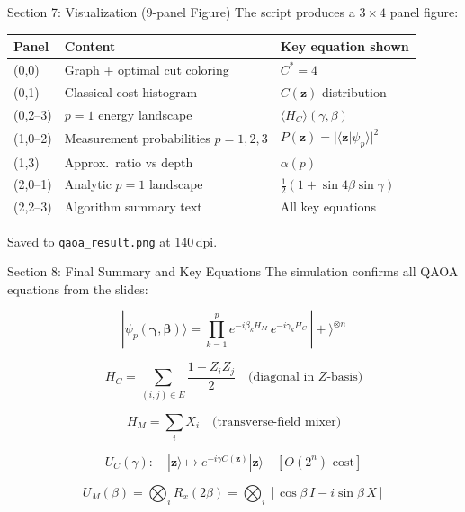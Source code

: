 \documentclass{beamer}
\begin{document}
\begin{frame}
\begin{frame}{Section 7: Visualization (9-panel Figure)}
The script produces a $3\times 4$ panel figure:

\medskip

\begin{center}
\small
\begin{tabular}{lll}
\hline
\textbf{Panel} & \textbf{Content} & \textbf{Key equation shown} \\
\hline
(0,0) & Graph + optimal cut coloring & $C^* = 4$ \\
(0,1) & Classical cost histogram & $C(\mathbf{z})$ distribution \\
(0,2--3) & $p=1$ energy landscape & $\langle H_C\rangle(\gamma,\beta)$ \\
(1,0--2) & Measurement probabilities $p=1,2,3$ & $P(\mathbf{z}) = |\langle\mathbf{z}|\psi_p\rangle|^2$ \\
(1,3) & Approx.\ ratio vs depth & $\alpha(p)$ \\
(2,0--1) & Analytic $p=1$ landscape & $\tfrac{1}{2}(1+\sin4\beta\sin\gamma)$ \\
(2,2--3) & Algorithm summary text & All key equations \\
\hline
\end{tabular}
\end{center}

\medskip

Saved to \texttt{qaoa\_result.png} at 140\,dpi.
\end{frame}


\begin{frame}{Section 8: Final Summary and Key Equations}
The simulation confirms all QAOA equations from the slides:

\[
  |\psi_p(\boldsymbol{\gamma},\boldsymbol{\beta})\rangle
  = \prod_{k=1}^{p} e^{-i\beta_k H_M}\,e^{-i\gamma_k H_C}\,|{+}\rangle^{\otimes n}
\]

\[
  H_C = \sum_{(i,j)\in E} \frac{1 - Z_i Z_j}{2}
  \quad\text{(diagonal in $Z$-basis)}
\]

\[
  H_M = \sum_i X_i
  \quad\text{(transverse-field mixer)}
\]

\[
  U_C(\gamma): \quad |\mathbf{z}\rangle \mapsto e^{-i\gamma C(\mathbf{z})}|\mathbf{z}\rangle
  \quad [O(2^n)\text{ cost}]
\]

\[
  U_M(\beta) = \bigotimes_i R_x(2\beta) = \bigotimes_i [\cos\beta\,I - i\sin\beta\,X]
\]


\end{frame}
\end{frame}
\end{document}
